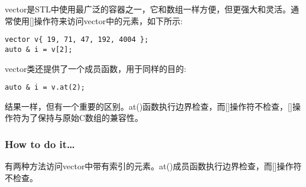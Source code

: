 
vector是STL中使用最广泛的容器之一，它和数组一样方便，但更强大和灵活。通常使用[]操作符来访问vector中的元素，如下所示:

\begin{lstlisting}[style=styleCXX]
vector v{ 19, 71, 47, 192, 4004 };
auto & i = v[2];
\end{lstlisting}

vector类还提供了一个成员函数，用于同样的目的:

\begin{lstlisting}[style=styleCXX]
auto & i = v.at(2);
\end{lstlisting}

结果一样，但有一个重要的区别。at()函数执行边界检查，而[]操作符不检查，[]操作符为了保持与原始C数组的兼容性。

\subsubsection{How to do it…}

有两种方法访问vector中带有索引的元素。at()成员函数执行边界检查，而[]操作符不检查。

